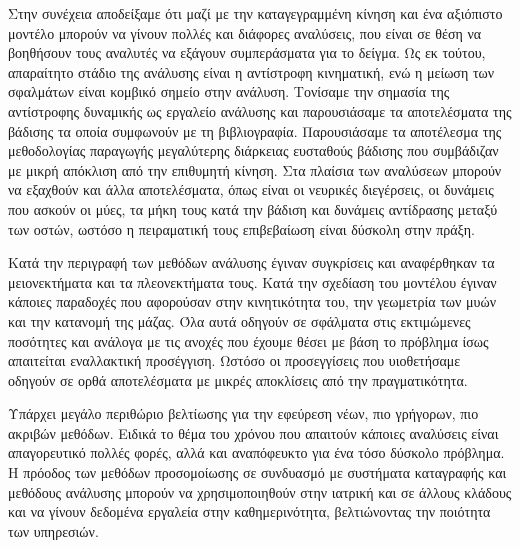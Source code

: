 Στην συνέχεια αποδείξαμε ότι μαζί με την καταγεγραμμένη κίνηση και ένα αξιόπιστο μοντέλο μπορούν να γίνουν πολλές και διάφορες αναλύσεις, που είναι σε θέση να βοηθήσουν τους αναλυτές να εξάγουν συμπεράσματα για το δείγμα. Ως εκ τούτου, απαραίτητο στάδιο της ανάλυσης είναι η αντίστροφη κινηματική, ενώ η μείωση των σφαλμάτων είναι κομβικό σημείο στην ανάλυση. Τονίσαμε την σημασία της αντίστροφης δυναμικής ως εργαλείο ανάλυσης και παρουσιάσαμε τα αποτελέσματα της βάδισης τα οποία συμφωνούν με τη βιβλιογραφία. Παρουσιάσαμε τα αποτέλεσμα της μεθοδολογίας παραγωγής μεγαλύτερης διάρκειας ευσταθούς βάδισης που συμβάδιζαν με μικρή απόκλιση από την επιθυμητή κίνηση. Στα πλαίσια των αναλύσεων μπορούν να εξαχθούν και άλλα αποτελέσματα, όπως είναι οι νευρικές διεγέρσεις, οι δυνάμεις που ασκούν οι μύες, τα μήκη τους κατά την βάδιση και δυνάμεις αντίδρασης μεταξύ των οστών, ωστόσο η πειραματική τους επιβεβαίωση είναι δύσκολη στην πράξη.

Κατά την περιγραφή των μεθόδων ανάλυσης έγιναν συγκρίσεις και αναφέρθηκαν τα μειονεκτήματα και τα πλεονεκτήματα τους. Κατά την σχεδίαση του μοντέλου έγιναν κάποιες παραδοχές που αφορούσαν στην κινητικότητα του, την γεωμετρία των μυών και την κατανομή της μάζας. Όλα αυτά οδηγούν σε σφάλματα στις εκτιμώμενες ποσότητες και ανάλογα με τις ανοχές που έχουμε θέσει με βάση το πρόβλημα ίσως απαιτείται εναλλακτική προσέγγιση. Ωστόσο οι προσεγγίσεις που υιοθετήσαμε οδηγούν σε ορθά αποτελέσματα με μικρές αποκλίσεις από την πραγματικότητα.

Υπάρχει μεγάλο περιθώριο βελτίωσης για την εφεύρεση νέων, πιο γρήγορων, πιο ακριβών μεθόδων. Ειδικά το θέμα του χρόνου που απαιτούν κάποιες αναλύσεις είναι απαγορευτικό πολλές φορές, αλλά και αναπόφευκτο για ένα τόσο δύσκολο πρόβλημα. Η πρόοδος των μεθόδων προσομοίωσης σε συνδυασμό με συστήματα καταγραφής και μεθόδους ανάλυσης μπορούν να χρησιμοποιηθούν στην ιατρική και σε άλλους κλάδους και να γίνουν δεδομένα εργαλεία στην καθημερινότητα, βελτιώνοντας την ποιότητα των υπηρεσιών.
